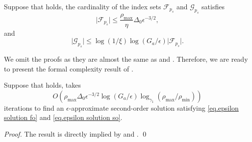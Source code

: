\begin{lemma}
    \label{lem.adaptive convex bound n}
    Suppose that  holds, the cardinality of the index sets $\mathcal{F}_{p_s}$ and $\mathcal{G}_{p_s}$ satisfies
    \begin{equation}\label{eq.adaptive convex bound n}
        \vert \mathcal{F}_{p_s}\vert \leq  \frac{\rho_{\max}}{\eta}\Delta_0\epsilon^{-3/2},
    \end{equation}
    and
    \begin{equation}
        \label{eq.adaptive bound g by f}
        \vert \mathcal{G}_{p_s} \vert \leq \log (1/\xi)\log (G_a/\epsilon) \vert \mathcal{F}_{p_s} \vert.
    \end{equation}
\end{lemma}
We omit the proofs as they are almost the same as  and . Therefore, we are ready to present the formal complexity result of .

\begin{theorem}
    \label{thm.adaptive nonconvex}
    Suppose that  holds,  takes
    \begin{equation}
        \label{eq.adaptive nonconvex}
        O\left(\rho_{\max}\Delta_0\epsilon^{-3/2}\log\left(G_a/\epsilon\right) \log_{\gamma_1} \left(\rho_{\max}/\rho_{\min}\right )\right)
    \end{equation}
    iterations to find an $\epsilon$-approximate second-order solution satisfying \eqref{eq.epsilon solution fo} and \eqref{eq.epsilon solution so}.
\end{theorem}
\begin{proof}
    The result is directly implied by  and .
\smartqed \qed \end{proof}
